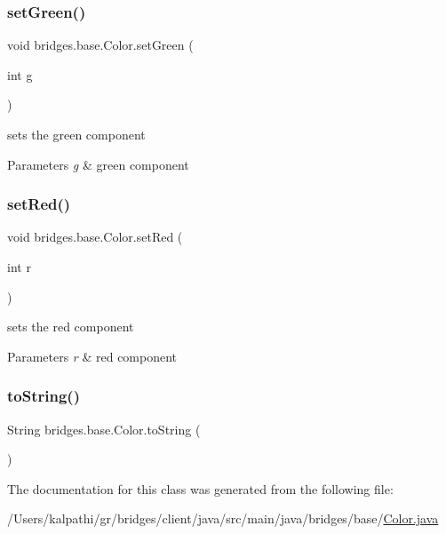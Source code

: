 \subsubsection{\texorpdfstring{set\+Green()}{setGreen()}}
{\footnotesize\ttfamily void bridges.\+base.\+Color.\+set\+Green (\begin{DoxyParamCaption}\item[{int}]{g }\end{DoxyParamCaption})}

sets the green component


\begin{DoxyParams}{Parameters}
{\em g} & green component \\
\hline
\end{DoxyParams}
\mbox{\label{classbridges_1_1base_1_1_color_a1d78967703924b709e76def5b2b3ee9a}} 
\subsubsection{\texorpdfstring{set\+Red()}{setRed()}}
{\footnotesize\ttfamily void bridges.\+base.\+Color.\+set\+Red (\begin{DoxyParamCaption}\item[{int}]{r }\end{DoxyParamCaption})}

sets the red component


\begin{DoxyParams}{Parameters}
{\em r} & red component \\
\hline
\end{DoxyParams}
\mbox{\label{classbridges_1_1base_1_1_color_a62e7406ca7d36ed755c28a86376328ba}} 
\subsubsection{\texorpdfstring{to\+String()}{toString()}}
{\footnotesize\ttfamily String bridges.\+base.\+Color.\+to\+String (\begin{DoxyParamCaption}{ }\end{DoxyParamCaption})}



The documentation for this class was generated from the following file\+:\begin{DoxyCompactItemize}
\item 
/\+Users/kalpathi/gr/bridges/client/java/src/main/java/bridges/base/\mbox{\hyperlink{_color_8java}{Color.\+java}}\end{DoxyCompactItemize}
